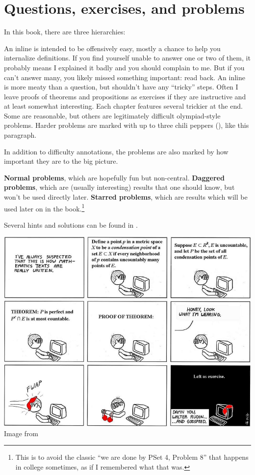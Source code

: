 \section{Questions, exercises, and problems}
In this book, there are three hierarchies:
\begin{itemize}
	\ii An inline  is intended to be offensively easy,
	mostly a chance to help you internalize definitions.
	If you find yourself unable to answer one or two of them,
	it probably means I explained it badly and you should complain to me.
	But if you can't answer many,
	you likely missed something important: read back.
	\ii An inline  is more meaty than a question,
	but shouldn't have any ``tricky'' steps.
	Often I leave proofs of theorems and propositions as exercises
	if they are instructive and at least somewhat interesting.
	\ii Each chapter features several trickier  at the end.
	Some are reasonable, but others are legitimately
	difficult olympiad-style problems.
	\gim Harder problems are marked with up to
	three chili peppers (\scalebox{0.7}{\chili}), like this paragraph.

	In addition to difficulty annotations,
	the problems are also marked by how important they are to the big picture.
	\begin{itemize}
		\ii \textbf{Normal problems},
		which are hopefully fun but non-central.
		\ii \textbf{Daggered problems},
		which are (usually interesting) results that one should know,
		but won't be used directly later.
		\ii \textbf{Starred problems},
		which are results which will be used later
		on in the book.\footnote{This is to avoid the classic
			``we are done by PSet 4, Problem 8''
			that happens in college sometimes,
			as if I remembered what that was.}
	\end{itemize}
\end{itemize}
Several hints and solutions can be found in .

\begin{center}
	\includegraphics[width=14cm]{media/abstruse-goose-exercise.png}
	\\ \scriptsize Image from \cite{img:exercise}
\end{center}

